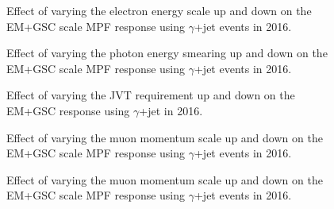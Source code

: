 \begin{figure}[!ht]
  \begin{center}
  \end{center}
  \caption[Effect of Egamma scale uncertainty on EM scale response with $\gamma$+jet]
  {Effect of varying the electron energy scale up and down on the EM+GSC scale MPF response using $\gamma$+jet events in 2016.}
  \label{plot:GJetEM2016EGScaleApp}
\end{figure}

\begin{figure}[!ht]
  \begin{center}
  \end{center}
  \caption[Egamma resolution uncertainty on EM scale response with $\gamma$+jet]
{Effect of varying the photon energy smearing up and down on the EM+GSC scale MPF response using $\gamma$+jet events in 2016.}
  \label{plot:GJetEM2016EGResolutionApp}
\end{figure}


\begin{figure}[!ht]
  \begin{center}
  \end{center}
  \caption[JVT uncertainty, EM+GSC scale with 2016 $\gamma$+jet]
  {Effect of varying the JVT requirement up and down on the EM+GSC response using $\gamma$+jet in 2016.}
  \label{plot:GJetEM2016JVTApp}
\end{figure}

\begin{figure}[!ht]
  \begin{center}
  \end{center}
  \caption[Muon inner detector uncertainty, EM+GSC scale with 2016 $\gamma$+jet]
  {Effect of varying the muon momentum scale up and down on the EM+GSC scale MPF response using $\gamma$+jet events in 2016.}
  \label{plot:GJetEM2016MScaleApp}
\end{figure}

\begin{figure}[!ht]
  \begin{center}
  \end{center}
  \caption[Muon inner detector uncertainty, EM+GSC scale with 2016 $\gamma$+jet]
  {Effect of varying the muon momentum scale up and down on the EM+GSC scale MPF response using $\gamma$+jet events in 2016.}
  \label{plot:GJetEM2016MScaleApp}
\end{figure}

